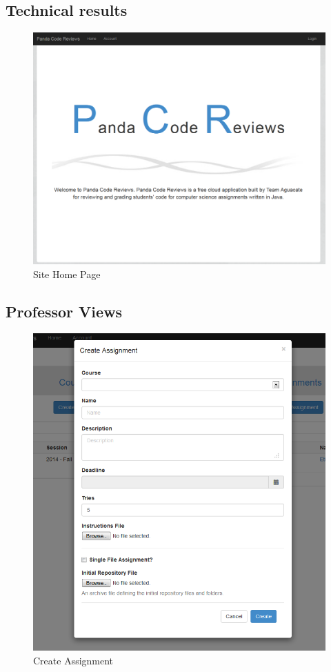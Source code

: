 \subsection{Technical results}

\begin{figure}[H]
	\centering
	\includegraphics[width=\textwidth]{img/home-screen}
	\caption{Site Home Page}
\end{figure}

\subsection{Professor Views}

\begin{figure}[H]
	\centering
	\includegraphics[width=\textwidth]{img/createassign-screen}
	\caption{Create Assignment}
\end{figure}


